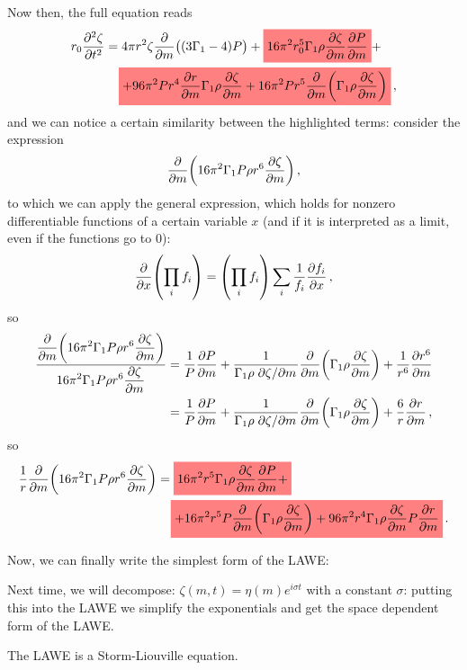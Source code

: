 \documentclass[main.tex]{subfiles}
\begin{document}
Now then, the full equation reads 
%
\begin{subequations}
\begin{align}
\begin{split}
r_0 \pdv[2]{\zeta }{t} &= 
4 \pi r^2 \zeta \pdv{}{m} \qty((3\Gamma_1 -4) P) 
+ \hlc{red}{16 \pi^2 r_0^5 \Gamma_1 \rho \pdv{\zeta }{m} \pdv{P}{m}} + \\
&\phantom{=}\ 
\hlc{red}{+ 96 \pi^2 P r^4 \pdv{r}{m} \Gamma_1 \rho \pdv{\zeta }{m}
+ 16 \pi^2 P r^5 \pdv{}{m} \qty(\Gamma_1 \rho \pdv{\zeta }{m})}
\,,
\end{split}
\end{align}
\end{subequations}
%
and we can notice a certain similarity between the highlighted terms: consider the expression 
%
\begin{align}
\pdv{}{m} \qty(16 \pi^2 \Gamma_1 P \rho r^{6} \pdv{\zeta }{m})
\,,
\end{align}
to which we can apply the general expression, which holds for nonzero differentiable functions of a certain variable \(x\) (and if it is interpreted as a limit, even if the functions go to 0): 
%
\begin{align}
\pdv{}{x} \qty(\prod_i f_i) 
= \qty(\prod_i f_i) \sum_i \frac{1}{f_i} \pdv{f_i}{x}
\,,
\end{align}
%
so 
%
\begin{subequations}
\begin{align}
\frac{\displaystyle\pdv{}{m} \qty(16 \pi^2 \Gamma_1 P \rho r^{6} \pdv{\zeta }{m})}{\displaystyle 16 \pi^2 \Gamma_1 P \rho r^{6} \pdv{\zeta }{m}} &= 
\frac{1}{P} \pdv{P}{m} 
+ \frac{1}{\Gamma_1 \rho \pdv*{\zeta }{m}} \pdv{}{m} \qty(\Gamma_1 \rho \pdv{\zeta }{m})
+ \frac{1}{r^{6}} \pdv{r^{6}}{m}  \\
&= \frac{1}{P} \pdv{P}{m} 
+ \frac{1}{\Gamma_1 \rho \pdv*{\zeta }{m}} \pdv{}{m} \qty(\Gamma_1 \rho \pdv{\zeta }{m})
+ \frac{6}{r} \pdv{r}{m} 
\,,
\end{align}
\end{subequations}
%
so 
%
\begin{align}
\begin{split}
\frac{1}{r} \pdv{}{m} \qty(16 \pi^2 \Gamma_1 P \rho r^{6} \pdv{\zeta }{m}) &= 
\hlc{red}{16 \pi^2 r^{5} \Gamma_1 \rho \pdv{\zeta }{m} \pdv{P}{m} +} \\
&\phantom{=}\ 
\hlc{red}{+ 16 \pi^2 r^{5} P \pdv{}{m} \qty(\Gamma_1 \rho \pdv{\zeta }{m}) + 96 \pi^2r^{4} \Gamma_1 \rho \pdv{\zeta }{m} P \pdv{r}{m}}
\,.
\end{split}
\end{align}

Now, we can finally write the simplest form of the LAWE:
%
\boxalign{
\begin{align}
r \pdv[2]{\zeta}{t} =
4 \pi r^2 \zeta \pdv{}{m} \qty((3 \Gamma_1 - 4)P)+
\frac{1}{r} \pdv{}{m} \qty(16 \pi^2 \Gamma_1 P \rho r^6 \pdv{\zeta}{m} )  
\,,
\end{align}}
%

Next time, we will decompose: \(\zeta(m, t) = \eta(m) e^{i \sigma t}\) with a constant \(\sigma\): putting this into the LAWE we simplify the exponentials and get the space dependent form of the LAWE.

The LAWE is a Storm-Liouville equation.
\end{document}
